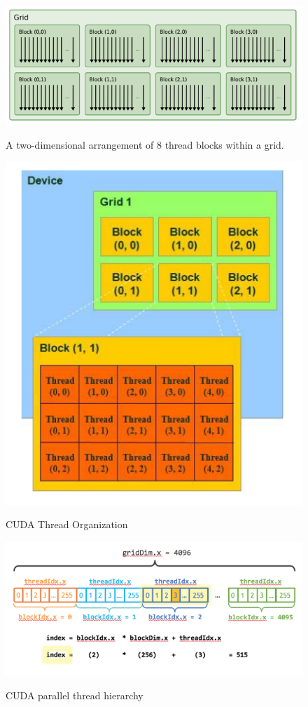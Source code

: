 \documentclass[Ingles]{ic-tese-v1}
\begin{document}
\begin{figure}[t]
	\centering
	\caption{A two-dimensional arrangement of 8 thread blocks within a grid.}
	\includegraphics[scale=0.70]{images/threadsblock.png}
	\label{fig:threadsblocks}
\end{figure}

\begin{figure}[t]
	\centering
	\caption{CUDA Thread Organization}
	\includegraphics[scale=0.70]{images/thread_organization.png}
	\label{fig:threadorganization}
\end{figure}

\begin{figure}[t]
	\caption{CUDA parallel thread hierarchy}
	\centering
	\includegraphics[scale=0.60]{images/cuda_indexing.png}
	\label{fig:cudaindex}
\end{figure}
\end{document}
